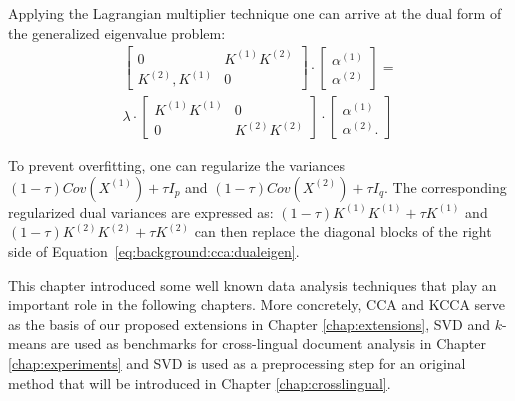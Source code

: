 Applying the Lagrangian multiplier technique one can arrive at the dual form of the generalized eigenvalue
problem:
\begin{align}\label{eq:background:cca:dualeigen}
\begin{bmatrix}
    0               & K^{(1)} K^{(2)} \\
    K^{(2)},K^{(1)} & 0
\end{bmatrix}
\cdot
\begin{bmatrix}
    \alpha^{(1)} \\
    \alpha^{(2)}
\end{bmatrix}
= \\
\lambda
\cdot
\begin{bmatrix}
    K^{(1)} K^{(1)} & 0 \\
    0 &  K^{(2)} K^{(2)}
\end{bmatrix}
\cdot
\begin{bmatrix}
    \alpha^{(1)} \\
    \alpha^{(2)}.
\end{bmatrix}
\end{align}

To prevent overfitting, one can regularize the variances $(1-\tau) Cov(X^{(1)}) + \tau I_p$ and $(1-\tau) Cov(X^({2})) + \tau I_q$.
The corresponding regularized dual variances are expressed as: $(1-\tau) K^{(1)}K^{(1)} + \tau K^{(1)}$ and $(1-\tau) K^{(2)}K^{(2)}+ \tau K^{(2)}$
can then replace the diagonal blocks of the right side of Equation~\ref{eq:background:cca:dualeigen}.

This chapter introduced some well known data analysis techniques that play an important role in the following chapters. More concretely, CCA and KCCA
serve as the basis of our proposed extensions in Chapter \ref{chap:extensions}, SVD and $k$-means are used as benchmarks for cross-lingual document
analysis in Chapter \ref{chap:experiments} and SVD is used as a preprocessing step for an original method that will be introduced in Chapter \ref{chap:crosslingual}.

